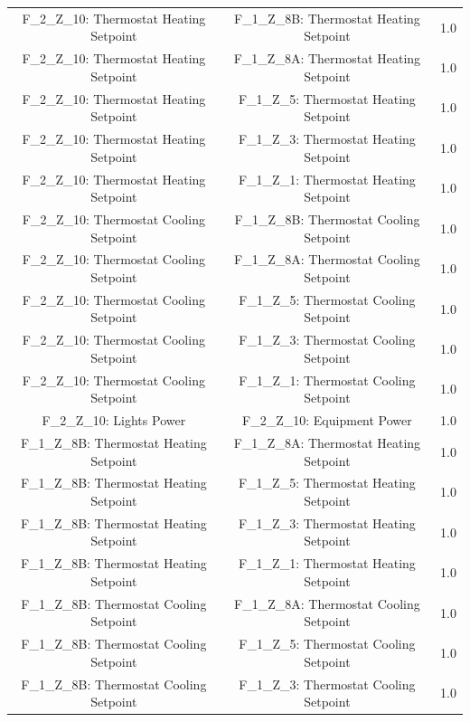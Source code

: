 \documentclass[aps, 10pt, a4paper]{article}
\begin{document}
\begin{longtable}{c|c||c}
                    F\_2\_Z\_10: Thermostat Heating Setpoint & F\_1\_Z\_8B: Thermostat Heating Setpoint & 1.0 \\
                    F\_2\_Z\_10: Thermostat Heating Setpoint & F\_1\_Z\_8A: Thermostat Heating Setpoint & 1.0 \\
                    F\_2\_Z\_10: Thermostat Heating Setpoint & F\_1\_Z\_5: Thermostat Heating Setpoint & 1.0 \\
                    F\_2\_Z\_10: Thermostat Heating Setpoint & F\_1\_Z\_3: Thermostat Heating Setpoint & 1.0 \\
                    F\_2\_Z\_10: Thermostat Heating Setpoint & F\_1\_Z\_1: Thermostat Heating Setpoint & 1.0 \\
                    F\_2\_Z\_10: Thermostat Cooling Setpoint & F\_1\_Z\_8B: Thermostat Cooling Setpoint & 1.0 \\
                    F\_2\_Z\_10: Thermostat Cooling Setpoint & F\_1\_Z\_8A: Thermostat Cooling Setpoint & 1.0 \\
                    F\_2\_Z\_10: Thermostat Cooling Setpoint & F\_1\_Z\_5: Thermostat Cooling Setpoint & 1.0 \\
                    F\_2\_Z\_10: Thermostat Cooling Setpoint & F\_1\_Z\_3: Thermostat Cooling Setpoint & 1.0 \\
                    F\_2\_Z\_10: Thermostat Cooling Setpoint & F\_1\_Z\_1: Thermostat Cooling Setpoint & 1.0 \\
                    F\_2\_Z\_10: Lights Power & F\_2\_Z\_10: Equipment Power & 1.0 \\
                    F\_1\_Z\_8B: Thermostat Heating Setpoint & F\_1\_Z\_8A: Thermostat Heating Setpoint & 1.0 \\
                    F\_1\_Z\_8B: Thermostat Heating Setpoint & F\_1\_Z\_5: Thermostat Heating Setpoint & 1.0 \\
                    F\_1\_Z\_8B: Thermostat Heating Setpoint & F\_1\_Z\_3: Thermostat Heating Setpoint & 1.0 \\
                    F\_1\_Z\_8B: Thermostat Heating Setpoint & F\_1\_Z\_1: Thermostat Heating Setpoint & 1.0 \\
                    F\_1\_Z\_8B: Thermostat Cooling Setpoint & F\_1\_Z\_8A: Thermostat Cooling Setpoint & 1.0 \\
                    F\_1\_Z\_8B: Thermostat Cooling Setpoint & F\_1\_Z\_5: Thermostat Cooling Setpoint & 1.0 \\
                    F\_1\_Z\_8B: Thermostat Cooling Setpoint & F\_1\_Z\_3: Thermostat Cooling Setpoint & 1.0 \\

\end{longtable}
\end{document}
